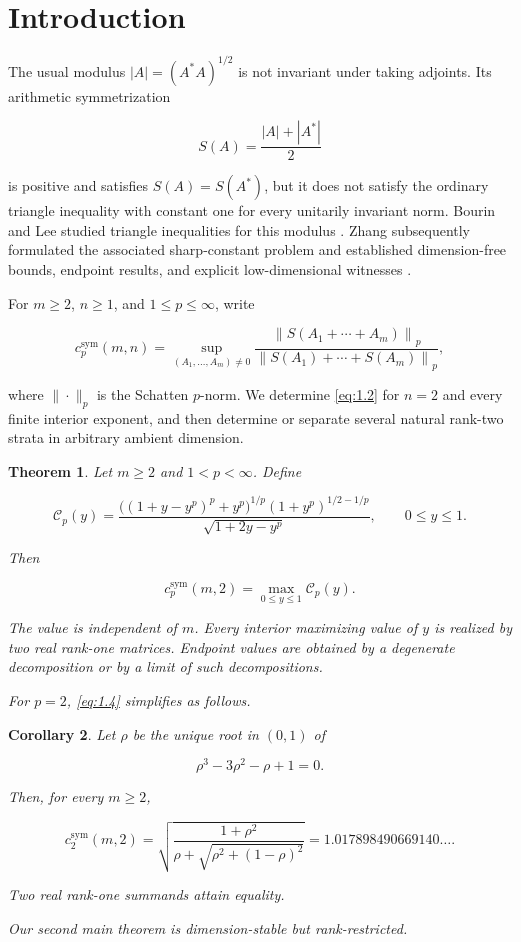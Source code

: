 \documentclass[11pt]{article}
\newtheorem{theorem}{Theorem}[section]
\newtheorem{corollary}[theorem]{Corollary}
\begin{document}
\section{Introduction}


The usual modulus $|A|=(A^*A)^{1/2}$ is not invariant under taking adjoints. Its
arithmetic symmetrization

\[
S(A)=\frac{|A|+|A^*|}{2}
\tag{1.1}\label{eq:1.1}
\]

is positive and satisfies $S(A)=S(A^*)$, but it does not satisfy the ordinary
triangle inequality with constant one for every unitarily invariant norm. Bourin
and Lee studied triangle inequalities for this modulus \cite{bourin-lee}. Zhang subsequently
formulated the associated sharp-constant problem and established dimension-free
bounds, endpoint results, and explicit low-dimensional witnesses \cite{zhang}.

For $m\ge2$, $n\ge1$, and $1\le p\le\infty$, write

\[
c_p^{\mathrm{sym}}(m,n)=
\sup_{(A_1,\ldots,A_m)\ne0}
\frac{\left\|S(A_1+\cdots+A_m)\right\|_p}
{\left\|S(A_1)+\cdots+S(A_m)\right\|_p},
\tag{1.2}\label{eq:1.2}
\]

where $\|\cdot\|_p$ is the Schatten $p$-norm. We determine \eqref{eq:1.2} for $n=2$
and every finite interior exponent, and then determine or separate several natural
rank-two strata in arbitrary ambient dimension.

\begin{theorem}
\label{thm:dimension-two}
Let $m\ge2$ and $1<p<\infty$. Define

\[
\mathcal C_p(y)=
\frac{\bigl((1+y-y^p)^p+y^p\bigr)^{1/p}
(1+y^p)^{1/2-1/p}}
{\sqrt{1+2y-y^p}},
\qquad 0\le y\le1.
\tag{1.3}\label{eq:1.3}
\]

Then

\[
\boxed{
c_p^{\mathrm{sym}}(m,2)=\max_{0\le y\le1}\mathcal C_p(y).}
\tag{1.4}\label{eq:1.4}
\]

The value is independent of $m$. Every interior maximizing value of $y$ is
realized by two real rank-one matrices. Endpoint values are obtained by a
degenerate decomposition or by a limit of such decompositions.

For $p=2$, \eqref{eq:1.4} simplifies as follows.

\end{theorem}

\begin{corollary}
\label{cor:frobenius-two}
Let $\rho$ be the unique root in $(0,1)$ of

\[
\rho^3-3\rho^2-\rho+1=0.
\]

Then, for every $m\ge2$,

\[
c_2^{\mathrm{sym}}(m,2)=
\sqrt{\frac{1+\rho^2}
{\rho+\sqrt{\rho^2+(1-\rho)^2}}}
=1.017898490669140\ldots.
\tag{1.5}\label{eq:1.5}
\]

Two real rank-one summands attain equality.

Our second main theorem is dimension-stable but rank-restricted.

\end{corollary}
\end{document}
